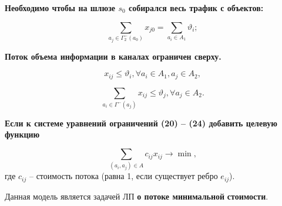 \begin{frame}

    \fontsize{10pt}{5.2}\selectfont
    \justifying

    \textbf{Необходимо чтобы на шлюзе $s_0$ собирался весь трафик с объектов:}

    \begin{equation}\label{eq:part2_1.3}
        \sum_{a_j \in \Gamma_2^-(a_0)} x_{j0} =  \sum_{a_i \in A_1} \vartheta_i;
    \end{equation}


    \textbf{Поток объема информации в каналах ограничен сверху.} 
    


    \begin{equation}\label{eq:part2_1.4_1}
        x_{ij} \leqslant \vartheta_i, \forall a_i \in A_1, a_j \in A_2,
    \end{equation}



    \begin{equation}\label{eq:part2_1.4_2}
        \sum_{a_i \in \Gamma^-(a_j)} x_{ij} \leqslant \vartheta_j, \forall a_j \in A_2.
    \end{equation}


    \textbf{Если к системе уравнений ограничений (20) -- (24) добавить целевую функцию}

    \begin{equation}
        \label{eq:part2_1.5}
        \sum_{(a_i, a_j) \in A} c_{ij} x_{ij} \rightarrow \min ,
    \end{equation}
    где $c_{ij}$ -- стоимость потока (равна 1, если существует ребро $e_{ij}$). 
    
    \medskip
    
    Данная модель является задачей ЛП \textbf{о потоке минимальной} \textbf{стоимости}. 

\end{frame}

